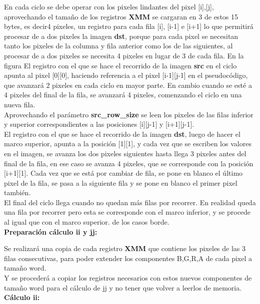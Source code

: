 En cada ciclo se debe operar con los pixeles lindantes del pixel [i],[j], aprovechando el tamaño de los registros \textbf{XMM} se cargaran en 3 de estos 15 bytes, es decir4 pixeles, un registro para cada fila [i], [i-1] e [i+1] lo que permitirá procesar de a dos pixeles la imagen \textbf{dst}, porque para cada pixel se necesitan tanto los pixeles de la columna y fila anterior como los de las siguientes, al procesar de a dos pixeles se necesita 4 pixeles en lugar de 3 de cada fila. En la figura %
El registro con el que se hace el recorrido de la imagen \textbf{src} en el ciclo apunta al pixel [0][0], haciendo referencia a el pixel [i-1][j-1] en el pseudocódigo, que avanzará 2 pixeles en cada ciclo en mayor parte. En cambio cuando se esté a 4 pixeles del final de la fila, se avanzará 4 pixeles, comenzando el ciclo en una nueva fila. \\ Aprovechando el parámetro \textbf{src_row_size} se leen los pixeles de las filas inferior y superior correspondientes a las posiciones [i][j-1] y [i+1][j-1]. \\
El registro con el que se hace el recorrido de la imagen \textbf{dst}, luego de hacer el marco superior, apunta a la posición [1][1], y cada vez que se escriben los valores en el imagen, se avanza los dos pixeles siguientes hasta llega 3 pixeles antes del final de la fila, en ese caso se  avanza 4 pixeles, que se corresponde con la posición [i+1][1].
Cada vez que se está por cambiar de fila, se pone en blanco el último pixel de la fila, se pasa a la siguiente fila y se pone en blanco el primer pixel también. \\
El final del ciclo llega cuando no quedan más filas por recorrer.
En realidad queda una fila por recorrer pero esta se corresponde con el marco inferior, y se procede al igual que con el marco superior.
de los casos borde.  \\

{\centering\textbf{Preparación cálculo ii y jj:}}

Se realizará una copia de cada registro \textbf{XMM} que contiene los pixeles de las 3 filas consecutivas, para poder extender los componentes B,G,R,A de cada pixel a tamaño word. \\
Y se procederá a copiar los registros necesarios con estos nuevos componentes de tamaño word para el cálculo de jj y no tener que volver a leerlos de memoria. \\


{\centering\textbf{Cálculo ii:}}

